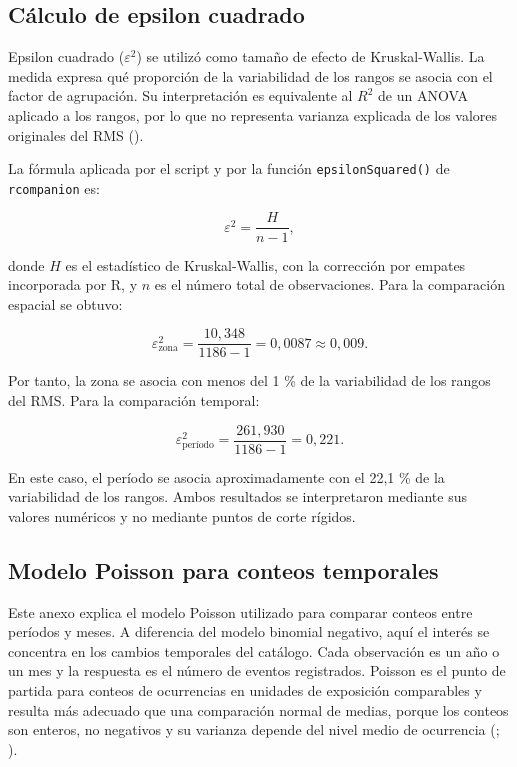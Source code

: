 \documentclass[
  spanish,
  letterpaper,
  DIV=11,
  numbers=noendperiod]{scrartcl}
\begin{document}
\subsection{Cálculo de epsilon cuadrado}\label{sec-anexo-epsilon}

Epsilon cuadrado (\(\varepsilon^2\)) se utilizó como tamaño de efecto de
Kruskal-Wallis. La medida expresa qué proporción de la variabilidad de
los rangos se asocia con el factor de agrupación. Su interpretación es
equivalente al \(R^2\) de un ANOVA aplicado a los rangos, por lo que no
representa varianza explicada de los valores originales del RMS
().

La fórmula aplicada por el script y por la función
\texttt{epsilonSquared()} de \texttt{rcompanion} es:

\[
\varepsilon^2=\frac{H}{n-1},
\]

donde \(H\) es el estadístico de Kruskal-Wallis, con la corrección por
empates incorporada por R, y \(n\) es el número total de observaciones.
Para la comparación espacial se obtuvo:

\[
\varepsilon^2_{\text{zona}}=
\frac{10{,}348}{1186-1}=0{,}0087\approx0{,}009.
\]

Por tanto, la zona se asocia con menos del 1 \% de la variabilidad de
los rangos del RMS. Para la comparación temporal:

\[
\varepsilon^2_{\text{período}}=
\frac{261{,}930}{1186-1}=0{,}221.
\]

En este caso, el período se asocia aproximadamente con el 22,1 \% de la
variabilidad de los rangos. Ambos resultados se interpretaron mediante
sus valores numéricos y no mediante puntos de corte rígidos.

\subsection{Modelo Poisson para conteos
temporales}\label{sec-anexo-poisson-temporal}

Este anexo explica el modelo Poisson utilizado para comparar conteos
entre períodos y meses. A diferencia del modelo binomial negativo, aquí
el interés se concentra en los cambios temporales del catálogo. Cada
observación es un año o un mes y la respuesta es el número de eventos
registrados. Poisson es el punto de partida para conteos de ocurrencias
en unidades de exposición comparables y resulta más adecuado que una
comparación normal de medias, porque los conteos son enteros, no
negativos y su varianza depende del nivel medio de ocurrencia
(;
).
\end{document}
